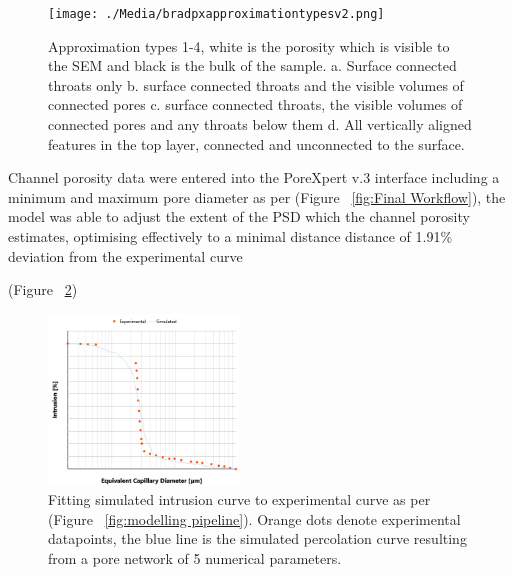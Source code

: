 \documentclass[review]{elsarticle}
\begin{document}
    \begin{figure}
	    \centering
	    \texttt{[image: ./Media/bradpxapproximationtypesv2.png]}
	    \caption{Approximation types 1-4, white is the porosity which is visible
       to the SEM and black is the bulk of the sample. a. Surface connected
       throats only b. surface connected throats and the visible volumes of
       connected pores c. surface connected throats, the visible volumes of
       connected pores and any throats below them d. All vertically aligned
       features in the top layer, connected and unconnected to the surface.  }
	    \label{fig:pxapproxtypes}
	\end{figure}

  Channel porosity data were entered into the PoreXpert v.3 interface including
  a minimum and maximum pore diameter as per (Figure ~\ref{fig:Final Workflow}),
  the model was able to adjust the extent of the PSD which the channel porosity
  estimates, optimising effectively to a minimal distance distance of 1.91\%
  deviation from the experimental curve

  (Figure ~\ref{fig:PXfittinggraph})
    \begin{figure}
        \centering
        \includegraphics[width=0.45\textwidth]{./Media/Fit to percolation curve.png}
        \caption{Fitting simulated intrusion curve to experimental curve  as per (Figure ~\ref{fig:modelling
        pipeline}). Orange dots denote experimental datapoints, the blue line is
        the simulated percolation curve resulting from a pore network of
        5 numerical parameters.}
        \label{fig:PXfittinggraph}
    \end{figure}
\end{document}

